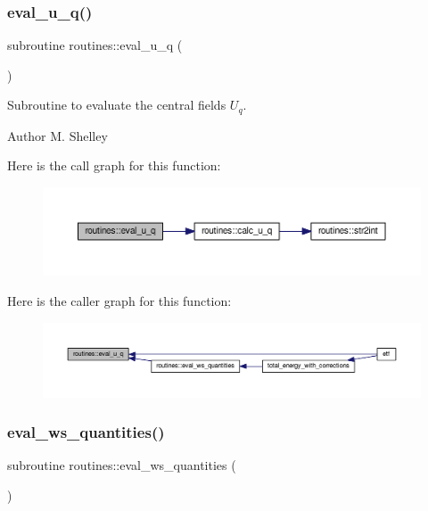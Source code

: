 \subsubsection{\texorpdfstring{eval\+\_\+u\+\_\+q()}{eval\_u\_q()}}
{\footnotesize\ttfamily subroutine routines\+::eval\+\_\+u\+\_\+q (\begin{DoxyParamCaption}{ }\end{DoxyParamCaption})}



Subroutine to evaluate the central fields $U_q$. 

\begin{DoxyAuthor}{Author}
M. Shelley 
\end{DoxyAuthor}
Here is the call graph for this function\+:
\nopagebreak
\begin{figure}[H]
\begin{center}
\leavevmode
\includegraphics[width=350pt]{namespaceroutines_a6ee5e5cd7ce81b013d18b19f5f9a4092_cgraph}
\end{center}
\end{figure}
Here is the caller graph for this function\+:
\nopagebreak
\begin{figure}[H]
\begin{center}
\leavevmode
\includegraphics[width=350pt]{namespaceroutines_a6ee5e5cd7ce81b013d18b19f5f9a4092_icgraph}
\end{center}
\end{figure}
\mbox{\label{namespaceroutines_a93de76f3b26ead66893f46dc4892dbcb}} 
\subsubsection{\texorpdfstring{eval\+\_\+ws\+\_\+quantities()}{eval\_ws\_quantities()}}
{\footnotesize\ttfamily subroutine routines\+::eval\+\_\+ws\+\_\+quantities (\begin{DoxyParamCaption}{ }\end{DoxyParamCaption})}



